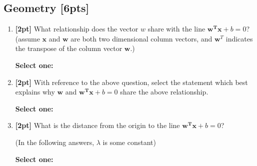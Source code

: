 \documentclass[12pt]{article}
\renewcommand{\circle}{\tikz\draw[black] (0,0) circle (1ex);}
\begin{document}
\subsection{Geometry [6pts]}
\begin{enumerate}
    \item \textbf{[2pt]} What relationship does the vector $w$ share with the line $\mathbf{w^Tx}+b = 0$?
    (assume $\mathbf{x}$ and $\mathbf{w}$ are both two dimensional column vectors, and $\mathbf{w}^T$ indicates the transpose of the column vector $\mathbf{w}$.)
    
    \textbf{Select one:}


    
    \item \textbf{[2pt]} With reference to the above question, select the statement which best explains why $\mathbf{w}$ and $\mathbf{w^Tx} + b = 0$ share the above relationship.
    
    \textbf{Select one:}


    
    \item \textbf{[2pt]} What is the distance from the origin to the line $\mathbf{w^Tx}+b=0$?
    
    (In the following answers, $\lambda$ is some constant)
    
    \textbf{Select one:}



  

    \clearpage
\end{enumerate}
\end{document}
